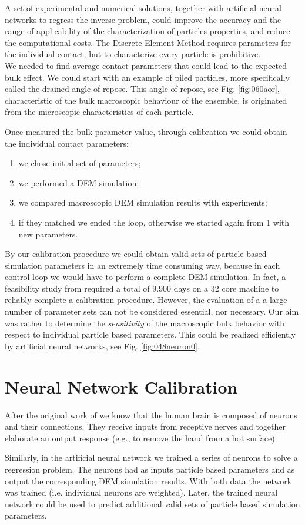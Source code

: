 A set of experimental and numerical solutions, together with artificial neural
networks to regress the inverse problem, could improve the accuracy and the
range of applicability of the characterization of particles properties, and reduce the computational costs.
The Discrete Element Method requires parameters for the individual contact, but
to characterize every particle is prohibitive.\\
We needed to find average contact parameters that could lead to the expected
bulk effect.
We could start with an example of piled particles, more specifically called the
drained angle of repose. This angle of repose, see Fig. \ref{fig:060aor},
characteristic of the bulk macroscopic behaviour of the ensemble, is originated from the microscopic
characteristics of each particle.

Once measured the bulk parameter value, through calibration we could obtain the
individual contact parameters:
\begin{enumerate}
\item{we chose initial set of parameters;}
\item{we performed a \acs{DEM} simulation;}
\item{we compared macroscopic \acs{DEM} simulation results with experiments;}
\item{if they matched we ended the loop, otherwise we started again from 1 with
new parameters.}
\end{enumerate}
By our calibration procedure we could obtain valid sets of particle based
simulation parameters in an extremely time consuming way, because in each
control loop we would have to perform a complete \acs{DEM} simulation.
In fact, a feasibility study from \citet{RefWorks:173}
required a total of
9.900 days on a 32 core machine to reliably complete a calibration procedure.
However, the evaluation of a a large number of parameter sets can not be
considered essential, nor necessary. 
Our aim was rather to determine the \textit{sensitivity} 
of the macroscopic bulk behavior with respect to individual particle based parameters.
This could be realized efficiently by artificial neural networks, see Fig.
\ref{fig:048neuron0}. 

\section{Neural Network Calibration}
\label{sec:neuralnetworkcalibration}

After the original work of \citet{RefWorks:189} we know that the human brain is
composed of neurons and their connections. 
They receive inputs from receptive
nerves and together elaborate an output response (e.g., to remove the hand from
a hot surface).

Similarly, in the artificial neural network we trained a series of neurons to
solve a regression problem.
The neurons had
as inputs particle based parameters and as output the corresponding \acs{DEM}
simulation results.
With both data the network was trained (i.e. individual neurons are
weighted).
Later, the trained neural network could be used to predict additional valid sets
of particle based simulation parameters.

